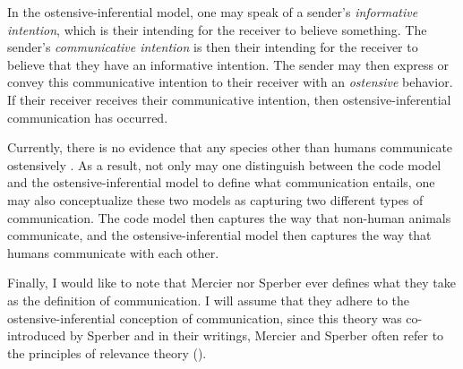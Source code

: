 In the ostensive-inferential model, one may speak of a sender's \emph{informative intention}, which is their intending for the receiver to believe something. The sender's \emph{communicative intention} is then their intending for the receiver to believe that they have an informative intention. The sender may then express or convey this communicative intention to their receiver with an \emph{ostensive} behavior. If their receiver receives their communicative intention, then ostensive-inferential communication has occurred.

Currently, there is no evidence that any species other than humans communicate ostensively \citep{Scott-Phillips18-communication}. As a result, not only may one distinguish between the code model and the ostensive-inferential model to define what communication entails, one may also conceptualize these two models as capturing two different types of communication. The code model then captures the way that non-human animals communicate, and the ostensive-inferential model then captures the way that humans communicate with each other.

Finally, I would like to note that Mercier nor Sperber ever defines what they take as the definition of communication. I will assume that they adhere to the ostensive-inferential conception of communication, since this theory was co-introduced by Sperber \citep{SperberWilson86} and in their writings, Mercier and Sperber often refer to the principles of relevance theory (\citeyear{MS09,MS11}).



